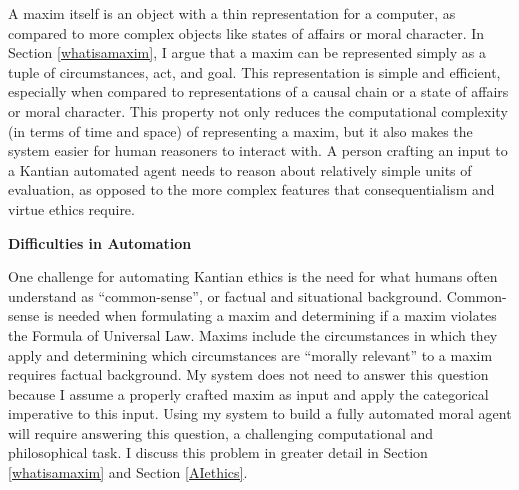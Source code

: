 \begin{isabellebody}
\begin{isamarkuptext}
A maxim itself is an object with a thin representation for a computer, as compared to more complex 
objects like states of affairs or moral character. In Section \ref{whatisamaxim}, I argue that a maxim can be 
represented simply as a tuple of circumstances, act, and goal.
This representation is simple and efficient, especially when compared to representations of a causal 
chain or a state of affairs or moral character. This property not only reduces the computational complexity
(in terms of time and space) of representing a maxim, but it also makes the system easier for human reasoners
to interact with. A person crafting an input to a Kantian automated agent needs to reason about relatively
simple units of evaluation, as opposed to the more complex features that consequentialism and virtue
ethics require.%
\end{isamarkuptext}\isamarkuptrue%
%
\begin{isamarkuptext}%
\noindent \textbf{Difficulties in Automation}%
\end{isamarkuptext}\isamarkuptrue%
%
\begin{isamarkuptext}%
One challenge for automating Kantian ethics is the need for what humans often understand as ``common-sense'', or factual and 
situational background. Common-sense is needed when formulating a maxim and determining if a maxim 
violates the Formula of Universal Law. Maxims include the circumstances in which they apply and
determining which circumstances are ``morally relevant'' to a maxim requires factual background. 
My system does not need to answer this question because I assume a properly crafted
maxim as input and apply the categorical imperative to this input. Using my system to build a fully automated
moral agent will require answering this question, a challenging computational and philosophical task. I
discuss this problem in greater detail in Section \ref{whatisamaxim} and Section \ref{AIethics}. 


\end{isamarkuptext}
\end{isabellebody}
